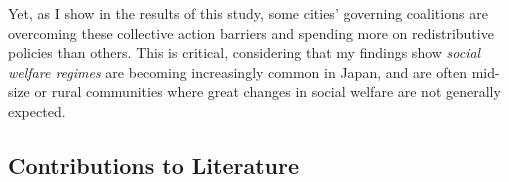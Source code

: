 \documentclass[preprint, 3p,
authoryear]{elsarticle} %
\begin{document}
Yet, as I show in the results of this study, some cities' governing
coalitions are overcoming these collective action barriers and spending
more on redistributive policies than others. This is critical,
considering that my findings show \emph{social welfare regimes} are
becoming increasingly common in Japan, and are often mid-size or rural
communities where great changes in social welfare are not generally
expected.

\hypertarget{contributions-to-literature}{%
\subsection{Contributions to
Literature}\label{contributions-to-literature}}

\renewcommand{\baselinestretch}{0.5}\selectfont
\renewcommand{\arraystretch}{1.5}

\begingroup\fontsize{9}{11}\selectfont
\end{document}
